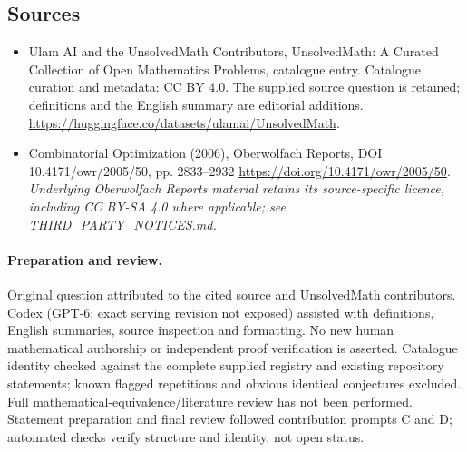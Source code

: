 \documentclass[11pt]{article}
\begin{document}
\subsection{Sources}
\begin{itemize}
\item[\hypertarget{source:statement:1}{S1}] Ulam AI and the UnsolvedMath Contributors, UnsolvedMath: A Curated Collection of Open Mathematics Problems, catalogue entry. Catalogue curation and metadata: CC BY 4.0. The supplied source question is retained; definitions and the English summary are editorial additions.
\url{https://huggingface.co/datasets/ulamai/UnsolvedMath}.
\item[\hypertarget{source:statement:2}{S2}] Combinatorial Optimization (2006), Oberwolfach Reports, DOI 10.4171/owr/2005/50, pp. 2833--2932
\url{https://doi.org/10.4171/owr/2005/50}.
\textit{Underlying Oberwolfach Reports material retains its source-specific licence, including CC BY-SA 4.0 where applicable; see THIRD\_PARTY\_NOTICES.md.}
\end{itemize}
\paragraph{Preparation and review.}
Original question attributed to the cited source and UnsolvedMath contributors. Codex (GPT-6; exact serving revision not exposed) assisted with definitions, English summaries, source inspection and formatting. No new human mathematical authorship or independent proof verification is asserted. Catalogue identity checked against the complete supplied registry and existing repository statements; known flagged repetitions and obvious identical conjectures excluded. Full mathematical-equivalence/literature review has not been performed. Statement preparation and final review followed contribution prompts C and D; automated checks verify structure and identity, not open status.
\label{end:statement}
\end{document}

